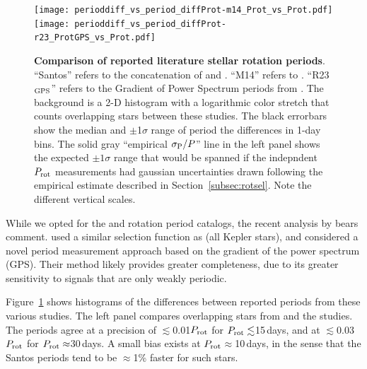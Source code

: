 \documentclass[11pt,twocolumn,tighten]{aastex63}
\begin{document}
\begin{figure}[!b]
  \begin{center}
    \leavevmode
      \texttt{[image: perioddiff\_vs\_period\_diffProt-m14\_Prot\_vs\_Prot.pdf]}
      \texttt{[image: perioddiff\_vs\_period\_diffProt-r23\_ProtGPS\_vs\_Prot.pdf]}
  \end{center}
  \vspace{-0.6cm}
  \caption{
    {\bf Comparison of reported literature stellar rotation periods}.
    ``Santos'' refers to the concatenation of \citet{Santos_2019} and
    \citet{Santos_2021}.  ``M14'' refers to \citet{McQuillan_2014}.
    ``R23$_{\rm GPS}$'' refers to the Gradient of Power Spectrum
    periods from \citet{Reinhold2023}.  The background is a 2-D
    histogram with a logarithmic color stretch that counts overlapping
    stars between these studies.  The black errorbars show the median
    and $\pm$1$\sigma$ range of period the differences in 1-day bins.
    The
    solid gray ``empirical $\sigma_{\rm P}/P$'' line in the left panel
    shows the expected $\pm 1\sigma$ range that would be spanned if
    the indepndent $P_{\rm rot}$ measurements had gaussian
    uncertainties drawn following the empirical estimate described in
    Section~\ref{subsec:rotsel}.
    Note the different vertical scales.
    \label{fig:perioddiff}
  }
\end{figure}

While we opted for the  and
 rotation period catalogs, the recent
analysis by \citet{Reinhold2023} bears comment.  \citet{Reinhold2023}
used a similar selection function as \citeauthor{Santos_2021}
(all Kepler stars), and considered a novel period measurement
approach based on the gradient of the power spectrum (GPS).  Their method
likely provides greater completeness, due to its greater sensitivity
to signals that are only weakly periodic.  

Figure~\ref{fig:perioddiff} shows histograms of the differences
between reported periods from these various studies.  The left panel
compares overlapping stars from \citet{McQuillan_2014} and
the \citeauthor{Santos_2021} studies.  The periods agree at a precision of
$\lesssim$0.01$P_{\rm rot}$ for $P_{\rm rot}\lesssim$15\,days, and at
$\lesssim$0.03$P_{\rm rot}$ for $P_{\rm rot}\approx$30\,days.  
A small bias exists at $P_{\rm rot}$$\approx$10\,days,
in the sense that the Santos periods tend to be $\approx$1\% faster
for such stars.
\end{document}
